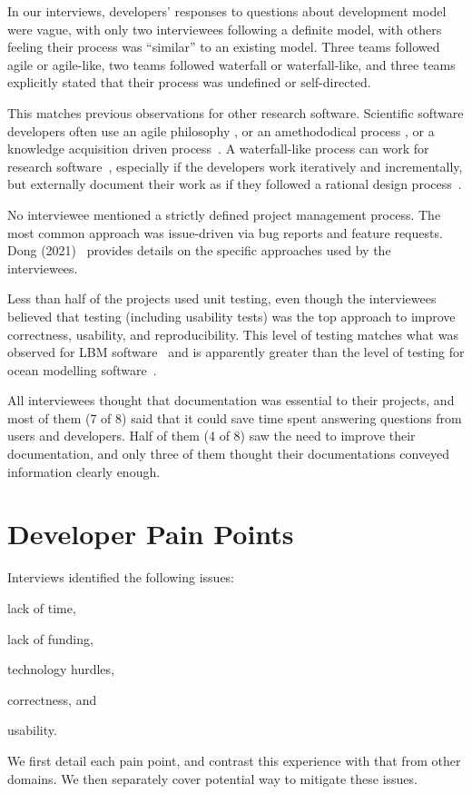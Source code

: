 \documentclass[draft, 12pt, 3p, times]{elsarticle} %
\begin{document}
In our interviews, developers' responses to questions about development model
were vague, with only two interviewees following a definite model, with others
feeling their process was ``similar'' to an existing model.  Three teams
followed agile or agile-like, two teams followed waterfall or waterfall-like,
and three teams explicitly stated that their process was undefined or
self-directed.

This matches previous observations for other research software.  Scientific
software developers often use an agile philosophy \cite{HeatonAndCarver2015,
CarverEtAl2007, AckroydEtAl2008, EasterbrookAndJohns2009, Segal2005}, or an
amethododical process \cite{Kelly2013}, or a knowledge acquisition driven
process~\cite{Kelly2015}.  A waterfall-like process can work for research
software~\cite{Smith2016}, especially if the developers work iteratively and
incrementally, but externally document their work as if they followed a rational
design process~\cite{parnas1986rational}.

No interviewee mentioned a strictly defined project management process. The most
common approach was issue-driven via bug reports and feature requests.  Dong
(2021)~\cite{Dong2021} provides details on the specific approaches used by the
interviewees.

Less than half of the projects used unit testing, even though the interviewees
believed that testing (including usability tests) was the top approach to
improve correctness, usability, and reproducibility.  This level of testing
matches what was observed for LBM software~\cite{Michalski2021} and is
apparently greater than the level of testing for ocean modelling
software~\cite{JungEtAl2022}.

All interviewees thought that documentation was essential to their projects, and
most of them (7 of 8) said that it could save time spent answering questions
from users and developers. Half of them (4 of 8) saw the need to improve their
documentation, and only three of them thought their documentations conveyed
information clearly enough.

\section{Developer Pain Points} \label{painpoints}

Interviews identified the following issues:
\begin{enumerate*}
\item lack of time,
\item lack of funding,
\item technology hurdles, 
\item correctness, and 
\item usability.  
\end{enumerate*}
We first detail each pain point, and contrast this experience with that from
other domains. We then separately cover potential way to mitigate these issues.
\end{document}
